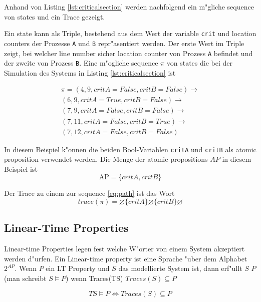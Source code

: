 \documentclass[11pt,twoside,a4paper]{article}
\begin{document}
Anhand von Listing \ref{lst:criticalsection} werden nachfolgend ein m"gliche sequence von states und ein Trace gezeigt.



Ein state kann als Triple, bestehend aus dem Wert der variable \verb|crit| und location counters der Prozesse \verb|A| und \verb|B| repr"asentiert werden. Der erste Wert im Triple zeigt, bei welcher line number sicher location counter von Prozess \verb|A| befindet und der zweite von Prozess \verb|B|.
Eine m"ogliche sequence $\pi$ von states die bei der Simulation des Systems in Listing \ref{lst:criticalsection} ist

\begin{equation}
  \label{eq:path}
  \begin{split}
\pi = (4, 9, {critA}={False},{critB}=False) \rightarrow \\
(6, 9, {critA}={True},{critB}=False) \rightarrow \\
(7, 9, {critA}={False},{critB}=False) \rightarrow \\
(7, 11, {critA}={False},{critB}=True) \rightarrow \\
(7, 12, {critA}={False},{critB}=False)
  \end{split}
\end{equation}

In diesem Beispiel k"onnen die beiden Bool-Variablen \verb|critA| und \verb|critB| als atomic proposition verwendet werden. Die Menge der atomic propositions $AP$ in diesem Beispiel ist
\[
\text{AP}=\{critA, critB\}
\]

Der Trace zu einem zur sequence \ref{eq:path} ist das Wort
\[
trace(\pi) = \varnothing \{critA\} \varnothing \{critB\} \varnothing
\]

\subsection{Linear-Time Properties}
\label{sec:satisfactionrelations}

Linear-time Properties legen fest welche W"orter von einem System akzeptiert werden d"urfen. Ein Linear-time property ist eine Sprache "uber dem Alphabet $2^{AP}$.
Wenn $P$ ein LT Property und $S$ das modellierte System ist, dann erf"ullt $S$ $P$ (man schreibt $S \models P$) wenn Traces(TS) $ Traces(S) \subseteq P $

\[
TS \models P \iff Traces(S) \subseteq P 
\]
\end{document}
